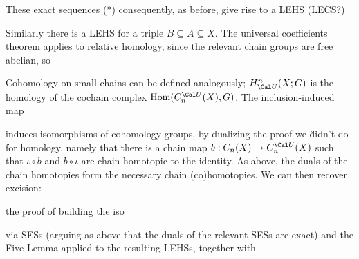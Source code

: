 \vfill
\eject


\ssk

These exact sequences (*) consequently, as before, give rise to a LEHS (LECS?)

\ssk


\ssk

Similarly there is a LEHS for a triple $B\subseteq A\subseteq X$. The universal 
coefficients theorem applies to relative homology, since the relevant chain groups are
free abelian, so 

\ssk


\ssk

Cohomology on small chains can be defined analogously;  $H^n_{\Cal U}(X;G)$ is the homology
of the cochain complex $\Hom(C_n^{\Cal U}(X),G)$. The inclusion-induced map

\ssk


\ssk

induces isomorphisms of cohomology
groups, by dualizing the proof we \u{didn't} do for homology, namely that there is a 
chain map 
$b:C_n(X)\ra C_n^{\Cal U}(X)$ such that $\iota\circ b$ and $b\circ\iota$ are chain 
homotopic to the identity. As above, the duals of the chain homotopies form the
necessary chain (co)homotopies. We can then recover excision:



the proof of building the iso

\ssk


\ssk

via SESs 
(arguing as above that the duals of the relevant SESs are exact) and the Five Lemma
applied to the resulting LEHSs, together with 

\ssk


